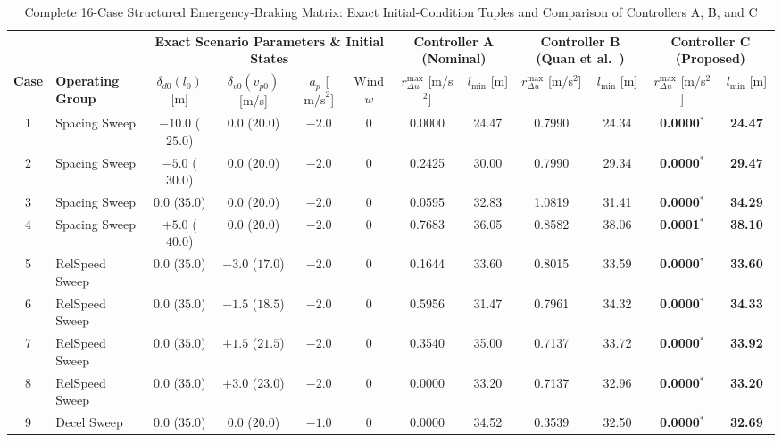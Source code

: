 \documentclass[journal]{IEEEtran}
\begin{document}
\begin{table}[t]
\centering
\caption{Complete 16-Case Structured Emergency-Braking Matrix: Exact Initial-Condition Tuples and Comparison of Controllers A, B, and C}
\label{tab:emergency16}
\setlength{\tabcolsep}{3.2pt}
\begin{tabular}{clcccccccccc}
\toprule
& & \multicolumn{4}{c}{\textbf{Exact Scenario Parameters \& Initial States}} & \multicolumn{2}{c}{\textbf{Controller A (Nominal)}} & \multicolumn{2}{c}{\textbf{Controller B (Quan et al.~\cite{Quan2024})}} & \multicolumn{2}{c}{\textbf{Controller C (Proposed)}} \\
\cmidrule(lr){3-6} \cmidrule(lr){7-8} \cmidrule(lr){9-10} \cmidrule(lr){11-12}
\textbf{Case} & \textbf{Operating Group} & $\delta_{d0} (l_0)$ [m] & $\delta_{v0} (v_{p0})$ [m/s] & $a_p$ [$\text{m/s}^2$] & Wind $w$ & $r_{\Delta u}^{\max}$ [m/s$^2$] & $l_{\min}$ [m] & $r_{\Delta u}^{\max}$ [m/s$^2$] & $l_{\min}$ [m] & $r_{\Delta u}^{\max}$ [m/s$^2$] & $l_{\min}$ [m] \\
\midrule
1 & Spacing Sweep & $-10.0$ ($25.0$) & $0.0$ ($20.0$) & $-2.0$ & 0 & 0.0000 & 24.47 & 0.7990 & 24.34 & \textbf{0.0000}$^*$ & \textbf{24.47} \\
2 & Spacing Sweep & $-5.0$ ($30.0$) & $0.0$ ($20.0$) & $-2.0$ & 0 & 0.2425 & 30.00 & 0.7990 & 29.34 & \textbf{0.0000}$^*$ & \textbf{29.47} \\
3 & Spacing Sweep & $0.0$ ($35.0$) & $0.0$ ($20.0$) & $-2.0$ & 0 & 0.0595 & 32.83 & 1.0819 & 31.41 & \textbf{0.0000}$^*$ & \textbf{34.29} \\
4 & Spacing Sweep & $+5.0$ ($40.0$) & $0.0$ ($20.0$) & $-2.0$ & 0 & 0.7683 & 36.05 & 0.8582 & 38.06 & \textbf{0.0001}$^*$ & \textbf{38.10} \\
\midrule
5 & RelSpeed Sweep & $0.0$ ($35.0$) & $-3.0$ ($17.0$) & $-2.0$ & 0 & 0.1644 & 33.60 & 0.8015 & 33.59 & \textbf{0.0000}$^*$ & \textbf{33.60} \\
6 & RelSpeed Sweep & $0.0$ ($35.0$) & $-1.5$ ($18.5$) & $-2.0$ & 0 & 0.5956 & 31.47 & 0.7961 & 34.32 & \textbf{0.0000}$^*$ & \textbf{34.33} \\
7 & RelSpeed Sweep & $0.0$ ($35.0$) & $+1.5$ ($21.5$) & $-2.0$ & 0 & 0.3540 & 35.00 & 0.7137 & 33.72 & \textbf{0.0000}$^*$ & \textbf{33.92} \\
8 & RelSpeed Sweep & $0.0$ ($35.0$) & $+3.0$ ($23.0$) & $-2.0$ & 0 & 0.0000 & 33.20 & 0.7137 & 32.96 & \textbf{0.0000}$^*$ & \textbf{33.20} \\
\midrule
9 & Decel Sweep & $0.0$ ($35.0$) & $0.0$ ($20.0$) & $-1.0$ & 0 & 0.0000 & 34.52 & 0.3539 & 32.50 & \textbf{0.0000}$^*$ & \textbf{32.69} \\

\end{tabular}
\end{table}
\end{document}
